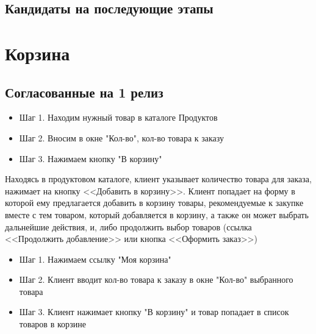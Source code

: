 
\ifcand
\subsection{Кандидаты на последующие этапы}
\fi


\section{Корзина}
\ifcand
\subsection{Согласованные на 1 релиз}
\fi
{}
{
\begin{itemize}
\item Шаг 1. Находим нужный товар в каталоге Продуктов
\item Шаг 2. Вносим в окне "Кол-во", кол-во товара к заказу
\item Шаг 3. Нажимаем кнопку "В корзину"
\end{itemize}

Находясь в продуктовом каталоге, клиент указывает количество товара для заказа, нажимает на кнопку <<Добавить в корзину>>. 
Клиент попадает на форму в которой ему предлагается добавить в корзину товары, рекомендуемые к закупке вместе с тем товаром, который добавляется в корзину, а также он может выбрать дальнейшие действия, и, либо продолжить выбор товаров (ссылка <<Продолжить добавление>> или кнопка <<Оформить заказ>>)
}
{
\begin{itemize}
\item Шаг 1. Нажимаем ссылку "Моя корзина"
\item Шаг 2. Клиент вводит кол-во товара к заказу в окне "Кол-во" выбранного товара
\item Шаг 3. Клиент нажимает кнопку "В корзину" и товар попадает в список товаров в корзине
\end{itemize}
}
\ifcand
